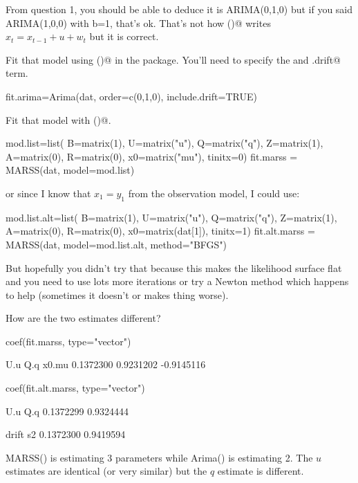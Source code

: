 \begin{wideenumerate}
\smallskip
From question 1, you should be able to deduce it is ARIMA(0,1,0) but if you said ARIMA(1,0,0) with b=1, that's ok.  That's not how \verb@Arima()@ writes $x_t = x_{t-1} + u + w_t$ but it is correct.
\item Fit that model using \verb@Arima()@ in the \verb@forecast@ package.  You'll need to specify the \verb@order@ and \verb@include.drift@ term.  
\begin{Schunk}
\begin{Sinput}
 fit.arima=Arima(dat, order=c(0,1,0), include.drift=TRUE)
\end{Sinput}
\end{Schunk}
\item Fit that model with \verb@MARSS()@.
\begin{Schunk}
\begin{Sinput}
 mod.list=list(
   B=matrix(1), U=matrix("u"), Q=matrix("q"),
   Z=matrix(1), A=matrix(0), R=matrix(0),
   x0=matrix("mu"), tinitx=0)
 fit.marss = MARSS(dat, model=mod.list)
\end{Sinput}
\end{Schunk}
or since I know that $x_1 = y_1$ from the observation model, I could use:
\begin{Schunk}
\begin{Sinput}
 mod.list.alt=list(
   B=matrix(1), U=matrix("u"), Q=matrix("q"),
   Z=matrix(1), A=matrix(0), R=matrix(0),
   x0=matrix(dat[1]), tinitx=1)
 fit.alt.marss = MARSS(dat, model=mod.list.alt, method="BFGS")
\end{Sinput}
\end{Schunk}
But hopefully you didn't try that because this makes the likelihood surface flat and you need to use lots more iterations or try a Newton method which happens to help (sometimes it doesn't or makes thing worse).
\item How are the two estimates different?
\begin{Schunk}
\begin{Sinput}
 coef(fit.marss, type="vector")
\end{Sinput}
\begin{Soutput}
       U.u        Q.q      x0.mu 
 0.1372300  0.9231202 -0.9145116 
\end{Soutput}
\begin{Sinput}
 coef(fit.alt.marss, type="vector")
\end{Sinput}
\begin{Soutput}
      U.u       Q.q 
0.1372299 0.9324444 
\end{Soutput}
\begin{Soutput}
    drift        s2 
0.1372300 0.9419594 
\end{Soutput}
\end{Schunk}
MARSS() is estimating 3 parameters while Arima() is estimating 2.  The $u$ estimates are identical (or very similar) but the $q$ estimate is different.


\end{wideenumerate}
